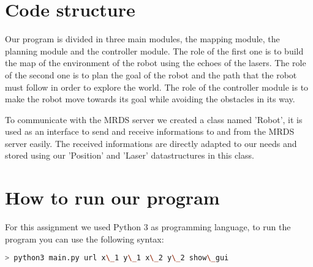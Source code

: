 \section{Code structure}

Our program is divided in three main modules, the mapping module, the planning module and the controller module.
The role of the first one is to build the map of the environment of the robot using the echoes of the lasers.
The role of the second one is to plan the goal of the robot and the path that the robot must follow in order to explore the world.
The role of the controller module is to make the robot move towards its goal while avoiding the obstacles in its way.

To communicate with the MRDS server we created a class named 'Robot', it is used as an interface to send and receive informations to and from the MRDS server easily.
The received informations are directly adapted to our needs and stored using our 'Position' and 'Laser' datastructures in this class.

\section{How to run our program}

For this assignment we used Python 3 as programming language, to run the program you can use the following syntax:

\begin{lstlisting}[language=bash]
> python3 main.py url x\_1 y\_1 x\_2 y\_2 show\_gui
\end{lstlisting}
